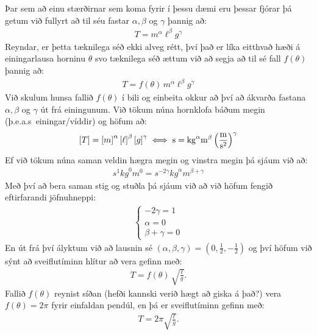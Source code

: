 Þar sem að einu stærðirnar sem koma fyrir í þessu dæmi eru þessar fjórar þá getum við fullyrt að til séu fastar $\alpha, \beta$ og $\gamma$ þannig að:
\begin{align*}
    T = m^\alpha \ell^\beta g^\gamma
\end{align*}
Reyndar, er þetta tæknilega séð ekki alveg rétt, því það er líka eitthvað hæði á einingarlausa horninu $\theta$ svo tæknilega séð ættum við að segja að til sé fall $f(\theta)$ þannig að:
\begin{align*}
    T = f(\theta) \, m^\alpha \ell^\beta g^\gamma
\end{align*}
Við skulum hunsa fallið $f(\theta)$ í bili og einbeita okkur að því að ákvarða fastana $\alpha, \beta$ og $\gamma$ út frá einingunum. Við tökum núna hornklofa báðum megin (þ.e.a.s~einingar/víddir) og höfum að:
\begin{align*}
    \left[ T \right] = \left[ m \right]^\alpha \left[ \ell \right]^\beta \left[ g \right]^\gamma \iff \si{s} = \si{kg}^\alpha \si{m}^\beta \left(\si[per-mode=fraction]{\metre\per\second\squared}\right)^\gamma
\end{align*}
Ef við tökum núna saman veldin hægra megin og vinstra megin þá sjáum við að:
\begin{align*}
    \si{s}^1 \si{kg}^0 \si{m}^0 = \si{s}^{-2\gamma} \si{kg}^\alpha \si{m}^{\beta + \gamma}
\end{align*}
Með því að bera saman stig og stuðla þá sjáum við að við höfum fengið eftirfarandi jöfnuhneppi:
\begin{align*}
    \begin{cases} -2\gamma = 1 \\
    \alpha = 0 \\
    \beta + \gamma = 0\end{cases} 
\end{align*}
En út frá því ályktum við að lausnin sé $(\alpha, \beta, \gamma) = (0, \frac{1}{2},-\frac{1}{2})$ og því höfum við sýnt að sveiflutíminn hlítur að vera gefinn með:
\begin{align*}
    T = f(\theta) \, \sqrt{\frac{\ell}{g}}.
\end{align*}
Fallið $f(\theta)$ reynist síðan (hefði kannski verið hægt að giska á það?) vera $f(\theta) = 2\pi$ fyrir einfaldan pendúl, en þá er sveiflutíminn gefinn með:
\begin{align*}
    T = 2\pi \sqrt{\frac{\ell}{g}}.
\end{align*}

\newpage


